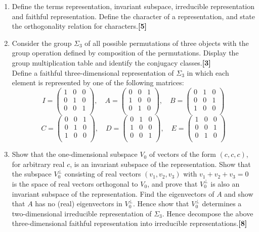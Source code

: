 \documentclass[a4paper]{article}
\begin{document}
\begin{qns}\leavevmode
\begin{enumerate}[label=(\roman*)]
    \item Define the terms representation, invariant subspace, irreducible representation and faithful representation. Define the character of a representation, and state the orthogonality relation for characters.\hfill\textbf{[5]}
    \item Consider the group $\Sigma_3$ of all possible permutations of three objects with the group operation defined by composition of the permutations. Display the group multiplication table and identify the conjugacy classes.\hfill\textbf{[3]}\\[5pt]
Define a faithful three-dimensional representation of $\Sigma_3$ in which each element is represented by one of the following matrices:
$$I=\begin{pmatrix}1&0&0\\0&1&0\\0&0&1\\\end{pmatrix},\quad A=\begin{pmatrix}0&0&1\\1&0&0\\0&1&0\\\end{pmatrix},\quad  B=\begin{pmatrix}0&1&0\\0&0&1\\1&0&0\\\end{pmatrix}$$
$$C=\begin{pmatrix}0&0&1\\0&1&0\\1&0&0\\\end{pmatrix},\quad D=\begin{pmatrix}0&1&0\\1&0&0\\0&0&1\\\end{pmatrix},\quad  E=\begin{pmatrix}1&0&0\\0&0&1\\0&1&0\\\end{pmatrix}$$
\item Show that the one-dimensional subspace $V_0$ of vectors of the form $(c, c, c)$, for arbitrary real $c$, is an invariant subspace of the representation. Show that the subspace $V^\perp_0$ consisting of real vectors $(v_1, v_2, v_3)$ with $v_1 + v_2 + v_3 = 0$ is the space of real vectors orthogonal to $V_0$, and prove that $V_0^\perp$ is also an invariant subspace of the representation. Find the eigenvectors of $A$ and show that $A$ has no (real) eigenvectors in $V^\perp_0$. Hence show that $V^\perp_0$ determines a two-dimensional irreducible representation of $\Sigma_3$. Hence decompose the above three-dimensional faithful representation into irreducible representations.\hfill\textbf{[8]}

\end{enumerate}
\end{qns}
\end{document}
